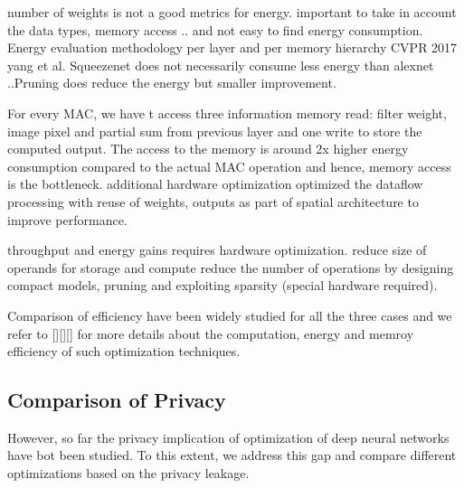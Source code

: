 number of weights is not a good metrics for energy. important to take in account the data types, memory access .. and not easy to find energy consumption.
Energy evaluation methodology per layer and per memory hierarchy CVPR 2017 yang et al.
Squeezenet does not necessarily consume less energy than alexnet ..Pruning does reduce the energy but smaller improvement.

For every MAC, we have t access three information memory read: filter weight, image pixel and partial sum from previous layer and one write to store the computed output.
The access to the memory is around 2x higher energy consumption compared to the actual MAC operation and hence, memory access is the bottleneck.
additional hardware optimization optimized the dataflow processing with reuse of weights, outputs as part of spatial architecture to improve performance.

throughput and energy gains requires hardware optimization. reduce size of operands for storage and compute
reduce the number of operations by designing compact models, pruning and exploiting sparsity (special hardware required).

Comparison of efficiency have been widely studied for all the three cases and we refer to [][][] for more details about the computation, energy and memroy efficiency of such optimization techniques.

\subsection{Comparison of Privacy}

However, so far the privacy implication of optimization of deep neural networks have bot been studied.
To this extent, we address this gap and compare different optimizations based on the privacy leakage.

